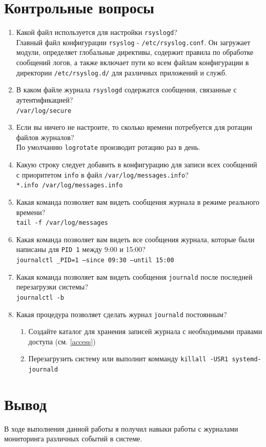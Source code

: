 \documentclass[12pt]{article}
\begin{document}
\section{Контрольные вопросы}
\begin{enumerate}
	\item Какой файл используется для настройки \texttt{rsyslogd}? \\
	      Главный файл конфигурации \texttt{rsyslog} - \texttt{/etc/rsyslog.conf}. Он загружает модули, определяет глобальные директивы, содержит правила по обработке сообщений логов, а также включает пути ко всем файлам конфигурации в директории \texttt{/etc/rsyslog.d/} для различных приложений и служб.
	\item В каком файле журнала \texttt{rsyslogd} содержатся сообщения, связанные с аутентификацией? \\
	      \texttt{/var/log/secure}
	\item Если вы ничего не настроите, то сколько времени потребуется для ротации файлов журналов? \\
	      По умолчанию \texttt{logrotate} производит ротацию раз в день.
	\item Какую строку следует добавить в конфигурацию для записи всех сообщений с приоритетом \texttt{info} в файл \texttt{/var/log/messages.info}? \\
	      \texttt{*.info /var/log/messages.info}
	\item Какая команда позволяет вам видеть сообщения журнала в режиме реального времени? \\
	      \texttt{tail -f /var/log/messages}
	\item Какая команда позволяет вам видеть все сообщения журнала, которые были написаны для \texttt{PID 1} между 9:00 и 15:00? \\
	      \texttt{journalctl \_PID=1 --since 09:30 --until 15:00}
	\item Какая команда позволяет вам видеть сообщения \texttt{journald} после последней перезагрузки системы? \\
	      \texttt{journalctl -b}
	\item Какая процедура позволяет сделать журнал \texttt{journald} постоянным? \\
	      \begin{enumerate}
		      \item Создайте каталог для хранения записей журнала с необходимыми правами доступа (см. \ref{access})
		      \item Перезагрузить систему или выполнит комманду \texttt{killall -USR1 systemd-journald}
	      \end{enumerate}
\end{enumerate}

\section{Вывод}
В ходе выполнения данной работы я получил навыки работы с журналами мониторинга различных событий в системе.
\end{document}
